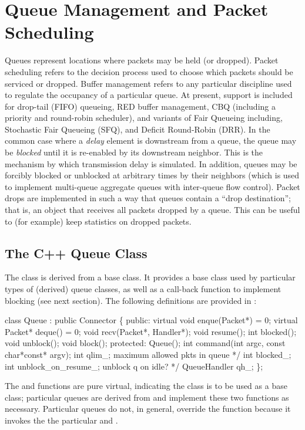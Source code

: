 %
%
\chapter{Queue Management and Packet Scheduling}
\label{chap:qmgmt}

Queues represent locations where packets may be held (or dropped).
Packet scheduling refers to the decision process used to choose
which packets should be serviced or dropped.
Buffer management refers to any particular discipline used
to regulate the occupancy of a particular queue.
At present, support is included for drop-tail (FIFO) queueing,
RED buffer management, CBQ (including a priority and round-robin scheduler), 
and
variants of Fair Queueing including, 
Stochastic Fair Queueing (SFQ), and Deficit Round-Robin (DRR).
In the common case where a {\em delay} element is downstream from
a queue, the queue may be {\em blocked} until it is re-enabled
by its downstream neighbor.
This is the mechanism by which transmission delay is simulated.
In addition, queues may be forcibly blocked or unblocked at arbitrary
times by their neighbors (which is used to implement multi-queue
aggregate queues with inter-queue flow control).
Packet drops are implemented in such a way that queues contain
a ``drop destination''; that is, an object that receives all packets
dropped by a queue.
This can be useful to (for example) keep statistics on dropped packets.

\section{The C++ Queue Class}
\label{sec:qclass}

The  class is derived from a  base class.
It provides a base class used by particular types of (derived) queue classes,
as well as a call-back function to implement blocking (see next section).
The following definitions are provided in :
\begin{program}
        class Queue : public Connector \{
         public:
                virtual void enque(Packet*) = 0;
                virtual Packet* deque() = 0;
                void recv(Packet*, Handler*);
                void resume();
                int blocked();
                void unblock();
                void block();
         protected:
                Queue();
                int command(int argc, const char*const* argv);
                int qlim_;         \* maximum allowed pkts in queue */
                int blocked_;
                int unblock_on_resume_; \* unblock q on idle? */
                QueueHandler qh_;
        \};
\end{program}
The  and  functions are pure virtual, indicating
the  class is to be used as a base class;
particular queues are derived
from  and implement these two functions as necessary.
Particular queues do not, in general, override the  function
because it invokes the
the particular  and .

